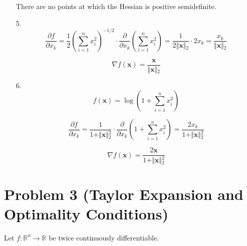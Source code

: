 \documentclass[10pt,a4paper]{article}
\begin{document}
\begin{enumerate}
    There are no points at which the Hessian is positive semidefinite.

    \item[5. ]
    $$
    \frac{\partial f}{\partial x_k}
    = \frac{1}{2}\left(\sum_{i=1}^n x_i^2\right)^{-1/2} \cdot \frac{\partial}{\partial x_k}\left(\sum_{i=1}^n x_i^2\right)
    = \frac{1}{2\Vert{}\mathbf{x}\Vert{}_2} \cdot 2x_k
    = \frac{x_k}{\Vert{}\mathbf{x}\Vert{}_2}
    $$

    $$
    \nabla f(\mathbf{x}) = \frac{\mathbf{x}}{\Vert{}\mathbf{x}\Vert{}_2}
    $$

    \item[6. ]
    $$
    f(\mathbf{x}) = \log\left(1 + \sum_{i=1}^n x_i^2\right)
    $$

    $$
    \frac{\partial f}{\partial x_k}
    = \frac{1}{1 + \Vert{}\mathbf{x}\Vert{}_2^2} \cdot \frac{\partial}{\partial x_k}\left(1 + \sum_{i=1}^n x_i^2\right)
    = \frac{2x_k}{1 + \Vert{}\mathbf{x}\Vert{}_2^2}
    $$

    $$
    \nabla f(\mathbf{x}) = \frac{2\mathbf{x}}{1 + \Vert{}\mathbf{x}\Vert{}_2^2}
    $$
\end{enumerate}

\newpage



\section*{Problem 3 (Taylor Expansion and Optimality Conditions)}

Let $f:\mathbb{R}^n\to\mathbb{R}$ be twice continuously
differentiable.
\end{document}

